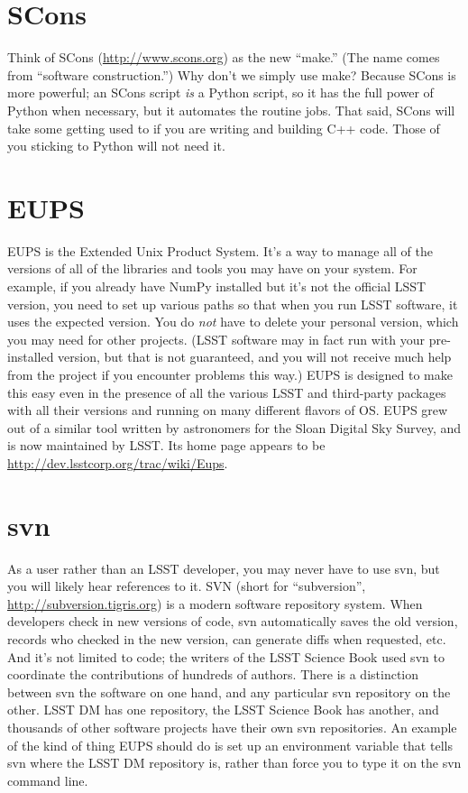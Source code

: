 \documentclass{book}
\begin{document}
\section{SCons}

Think of SCons (\url{http://www.scons.org}) as the new ``make.''  (The
name comes from ``software construction.'')  Why don't we simply use
make?  Because SCons is more powerful; an SCons script {\it is} a
Python script, so it has the full power of Python when necessary, but
it automates the routine jobs.  That said, SCons will take some
getting used to if you are writing and building C++ code.  Those of
you sticking to Python will not need it.

\section{EUPS}

EUPS is the Extended Unix Product System.  It's a way to manage all of
the versions of all of the libraries and tools you may have on your
system.  For example, if you already have NumPy installed but it's not
the official LSST version, you need to set up various paths so that
when you run LSST software, it uses the expected version.  You do {\it
  not} have to delete your personal version, which you may need for
other projects.  (LSST software may in fact run with your
pre-installed version, but that is not guaranteed, and you will not
receive much help from the project if you encounter problems this
way.)  EUPS is designed to make this easy even in the presence of all
the various LSST and third-party packages with all their versions and
running on many different flavors of OS.  EUPS grew out of a similar
tool written by astronomers for the Sloan Digital Sky Survey, and is
now maintained by LSST.  Its home page appears to be
\url{http://dev.lsstcorp.org/trac/wiki/Eups}.

\section{svn}

As a user rather than an LSST developer, you may never have to use
svn, but you will likely hear references to it.  SVN (short for
``subversion'', \url{http://subversion.tigris.org}) is a modern
software repository system.  When developers check in new versions of
code, svn automatically saves the old version, records who checked in
the new version, can generate diffs when requested, etc.  And it's not
limited to code; the writers of the LSST Science Book used svn to
coordinate the contributions of hundreds of authors.  There is a
distinction between svn the software on one hand, and any particular
svn repository on the other.  LSST DM has one repository, the LSST
Science Book has another, and thousands of other software projects
have their own svn repositories.  An example of the kind of thing EUPS
should do is set up an environment variable that tells svn where the
LSST DM repository is, rather than force you to type it on the svn
command line.
\end{document}
